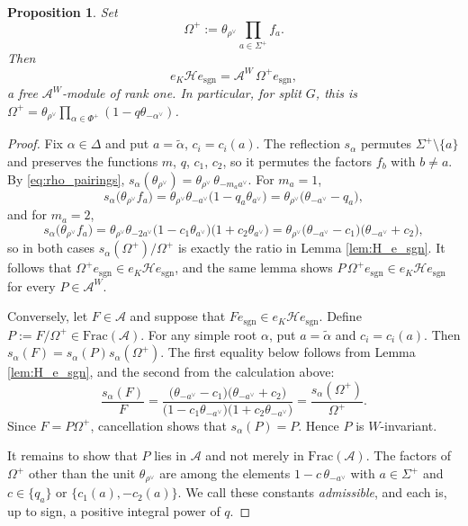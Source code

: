 \documentclass[12pt]{article}
\numberwithin{equation}{section}
\newtheorem{proposition}[theorem]{Proposition}
\theoremstyle{definition}
\theoremstyle{remark}
\theoremstyle{plain}
\begin{document}
\begin{proposition} \label{prop:eKHe_sgn}
Set
$$\Omega^{+} := \theta_{\rho^\vee} \prod_{a \in \Sigma^+} f_a.$$
Then
$$e_K \mathcal{H} e_{\mathrm{sgn}} = \mathcal{A}^W\,\Omega^+e_{\mathrm{sgn}},$$
a free $\mathcal{A}^W$-module of rank one.
In particular, for split $G$, this is $\Omega^+ = \theta_{\rho^\vee}\prod_{\alpha\in\Phi^+}(1 - q\theta_{-\alpha^\vee})$.
\end{proposition}
\begin{proof}
Fix $\alpha \in \Delta$ and put $a = \tilde\alpha$, $c_i = c_i(a)$. The reflection $s_\alpha$ permutes $\Sigma^+ \setminus \{a\}$ and preserves the functions $m$, $q$, $c_1$, $c_2$, so it permutes the factors $f_b$ with $b \neq a$. By \eqref{eq:rho_pairings}, $s_\alpha(\theta_{\rho^\vee}) = \theta_{\rho^\vee}\, \theta_{-m_a a^\vee}$. For $m_a = 1$,
$$s_\alpha\big(\theta_{\rho^\vee} f_a\big) = \theta_{\rho^\vee}\theta_{-a^\vee}\big(1 - q_a\theta_{a^\vee}\big) = \theta_{\rho^\vee}\big(\theta_{-a^\vee} - q_a\big),$$
and for $m_a = 2$,
$$s_\alpha\big(\theta_{\rho^\vee} f_a\big) = \theta_{\rho^\vee}\theta_{-2a^\vee}\big(1 - c_1\theta_{a^\vee}\big)\big(1 + c_2\theta_{a^\vee}\big) = \theta_{\rho^\vee}\big(\theta_{-a^\vee} - c_1\big)\big(\theta_{-a^\vee} + c_2\big),$$
so in both cases $s_\alpha(\Omega^+)/\Omega^+$ is exactly the ratio in Lemma \ref{lem:H_e_sgn}. It follows that $\Omega^{+}e_{\mathrm{sgn}} \in e_K \mathcal{H} e_{\mathrm{sgn}}$, and the same lemma shows $P\,\Omega^{+}e_{\mathrm{sgn}} \in e_K \mathcal{H} e_{\mathrm{sgn}}$ for every $P \in \mathcal{A}^W$.

Conversely, let $F\in\mathcal A$ and suppose that $Fe_{\mathrm{sgn}}\in e_K\mathcal He_{\mathrm{sgn}}$. Define $P := F / \Omega^{+} \in \mathrm{Frac}(\mathcal{A})$. For any simple root $\alpha$, put $a=\tilde\alpha$ and $c_i=c_i(a)$. Then $s_{\alpha}(F) = s_{\alpha}(P) s_{\alpha}(\Omega^{+})$. The first equality below follows from Lemma \ref{lem:H_e_sgn}, and the second from the calculation above:
$$
\frac{s_\alpha(F)}{F}
=
\frac{\big(\theta_{-a^\vee} - c_1\big)\big(\theta_{-a^\vee} + c_2\big)}
{\big(1 - c_1\theta_{-a^\vee}\big)\big(1 + c_2\theta_{-a^\vee}\big)}
=
\frac{s_\alpha(\Omega^+)}{\Omega^+}.
$$
Since $F=P\Omega^+$, cancellation shows that $s_\alpha(P)=P$. Hence $P$ is $W$-invariant.

It remains to show that $P$ lies in $\mathcal{A}$ and not merely in $\mathrm{Frac}(\mathcal{A})$. The factors of $\Omega^+$ other than the unit $\theta_{\rho^\vee}$ are among the elements $1 - c\,\theta_{-a^\vee}$ with $a \in \Sigma^+$ and $c \in \{q_a\}$ or $\{c_1(a), -c_2(a)\}$. We call these constants \emph{admissible}, and each is, up to sign, a positive integral power of $q$.


\end{proof}
\end{document}
